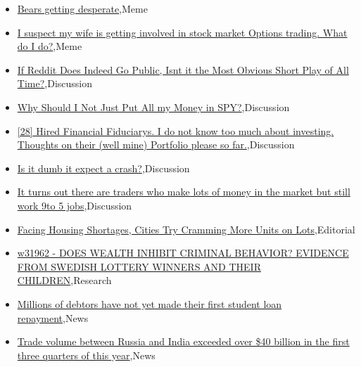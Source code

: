 \documentclass{article}%
\begin{document}
%
\begin{itemize}%
\item%
\href{https://reddit.com/r/wallstreetbets/comments/18qehnl/bears\_getting\_desperate/}{Bears  getting desperate},Meme%
\item%
\href{https://reddit.com/r/wallstreetbets/comments/18qcu8v/i\_suspect\_my\_wife\_is\_getting\_involved\_in\_stock/}{I suspect my wife is getting involved in stock market Options trading. What do I do?},Meme%
\item%
\href{https://reddit.com/r/wallstreetbets/comments/18qcjxp/if\_reddit\_does\_indeed\_go\_public\_isnt\_it\_the\_most/}{If Reddit Does Indeed Go Public, Isnt it the Most Obvious Short Play of All Time?},Discussion%
\item%
\href{https://reddit.com/r/wallstreetbets/comments/18qccgs/why\_should\_i\_not\_just\_put\_all\_my\_money\_in\_spy/}{Why Should I Not Just Put All my Money in SPY?},Discussion%
\item%
\href{https://reddit.com/r/StockMarket/comments/18q9ln0/28\_hired\_financial\_fiduciarys\_i\_do\_not\_know\_too/}{[28] Hired Financial Fiduciarys. I do not know too much about investing. Thoughts on their (well mine) Portfolio please so far.},Discussion%
\item%
\href{https://reddit.com/r/StockMarket/comments/18q8yer/is\_it\_dumb\_it\_expect\_a\_crash/}{Is it dumb it expect a crash?},Discussion%
\item%
\href{https://reddit.com/r/StockMarket/comments/18q22y8/it\_turns\_out\_there\_are\_traders\_who\_make\_lots\_of/}{It turns out there are traders who make lots of money in the market but still work 9to 5 jobs},Discussion%
\item%
\href{https://reddit.com/r/Economics/comments/18q1i76/facing\_housing\_shortages\_cities\_try\_cramming\_more/}{Facing Housing Shortages, Cities Try Cramming More Units on Lots},Editorial%
\item%
\href{https://reddit.com/r/Economics/comments/18pzqho/w31962\_does\_wealth\_inhibit\_criminal\_behavior/}{w31962 - DOES WEALTH INHIBIT CRIMINAL BEHAVIOR? EVIDENCE FROM SWEDISH LOTTERY WINNERS AND THEIR CHILDREN},Research%
\item%
\href{https://reddit.com/r/Economics/comments/18pt6f0/millions\_of\_debtors\_have\_not\_yet\_made\_their\_first/}{Millions of debtors have not yet made their first student loan repayment},News%
\item%
\href{https://reddit.com/r/Economics/comments/18ps3ft/trade\_volume\_between\_russia\_and\_india\_exceeded/}{Trade volume between Russia and India exceeded over \$40 billion in the first three quarters of this year},News%

\end{itemize}
\end{document}
